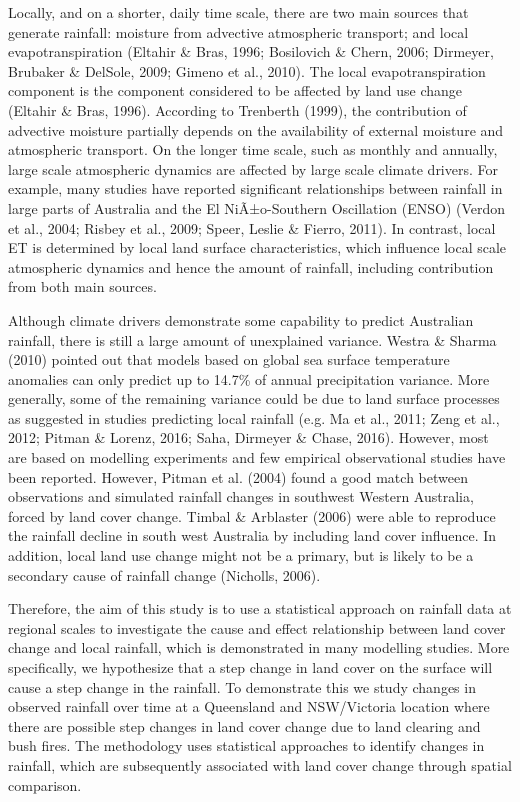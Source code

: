 \documentclass[fleqn,10pt,lineno]{wlpeerj} %
\theoremstyle{definition}
\theoremstyle{definition}
\theoremstyle{definition}
\theoremstyle{remark}
\begin{document}
Locally, and on a shorter, daily time scale, there are two main sources
that generate rainfall: moisture from advective atmospheric transport;
and local evapotranspiration (Eltahir \& Bras, 1996; Bosilovich \&
Chern, 2006; Dirmeyer, Brubaker \& DelSole, 2009; Gimeno et al., 2010).
The local evapotranspiration component is the component considered to be
affected by land use change (Eltahir \& Bras, 1996). According to
Trenberth (1999), the contribution of advective moisture partially
depends on the availability of external moisture and atmospheric
transport. On the longer time scale, such as monthly and annually, large
scale atmospheric dynamics are affected by large scale climate drivers.
For example, many studies have reported significant relationships
between rainfall in large parts of Australia and the El NiÃ±o-Southern
Oscillation (ENSO) (Verdon et al., 2004; Risbey et al., 2009; Speer,
Leslie \& Fierro, 2011). In contrast, local ET is determined by local
land surface characteristics, which influence local scale atmospheric
dynamics and hence the amount of rainfall, including contribution from
both main sources.

Although climate drivers demonstrate some capability to predict
Australian rainfall, there is still a large amount of unexplained
variance. Westra \& Sharma (2010) pointed out that models based on
global sea surface temperature anomalies can only predict up to 14.7\%
of annual precipitation variance. More generally, some of the remaining
variance could be due to land surface processes as suggested in studies
predicting local rainfall (e.g. Ma et al., 2011; Zeng et al., 2012;
Pitman \& Lorenz, 2016; Saha, Dirmeyer \& Chase, 2016). However, most
are based on modelling experiments and few empirical observational
studies have been reported. However, Pitman et al. (2004) found a good
match between observations and simulated rainfall changes in southwest
Western Australia, forced by land cover change. Timbal \& Arblaster
(2006) were able to reproduce the rainfall decline in south west
Australia by including land cover influence. In addition, local land use
change might not be a primary, but is likely to be a secondary cause of
rainfall change (Nicholls, 2006).

Therefore, the aim of this study is to use a statistical approach on
rainfall data at regional scales to investigate the cause and effect
relationship between land cover change and local rainfall, which is
demonstrated in many modelling studies. More specifically, we
hypothesize that a step change in land cover on the surface will cause a
step change in the rainfall. To demonstrate this we study changes in
observed rainfall over time at a Queensland and NSW/Victoria location
where there are possible step changes in land cover change due to land
clearing and bush fires. The methodology uses statistical approaches to
identify changes in rainfall, which are subsequently associated with
land cover change through spatial comparison.
\end{document}
